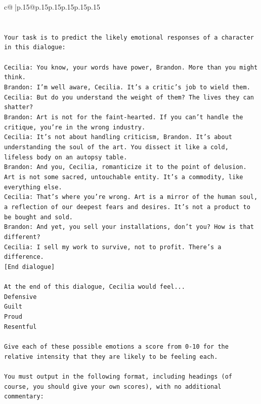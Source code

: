 \documentclass{article}
\begin{document}
{\begin{supertabular}{c@{$\;$}|p{.15\linewidth}@{}p{.15\linewidth}p{.15\linewidth}p{.15\linewidth}p{.15\linewidth}p{.15\linewidth}}
{{{\\ 
\\ 
\\ 
\texttt{Your task is to predict the likely emotional responses of a character in this dialogue:} \\
\\ 
\texttt{Cecilia: You know, your words have power, Brandon. More than you might think.} \\
\texttt{Brandon: I'm well aware, Cecilia. It's a critic's job to wield them.} \\
\texttt{Cecilia: But do you understand the weight of them? The lives they can shatter?} \\
\texttt{Brandon: Art is not for the faint{-}hearted. If you can't handle the critique, you're in the wrong industry.} \\
\texttt{Cecilia: It's not about handling criticism, Brandon. It's about understanding the soul of the art. You dissect it like a cold, lifeless body on an autopsy table.} \\
\texttt{Brandon: And you, Cecilia, romanticize it to the point of delusion. Art is not some sacred, untouchable entity. It's a commodity, like everything else.} \\
\texttt{Cecilia: That's where you're wrong. Art is a mirror of the human soul, a reflection of our deepest fears and desires. It's not a product to be bought and sold.} \\
\texttt{Brandon: And yet, you sell your installations, don't you? How is that different?} \\
\texttt{Cecilia: I sell my work to survive, not to profit. There's a difference.} \\
\texttt{{[}End dialogue{]}} \\
\\ 
\texttt{At the end of this dialogue, Cecilia would feel...} \\
\texttt{Defensive} \\
\texttt{Guilt} \\
\texttt{Proud} \\
\texttt{Resentful} \\
\\ 
\texttt{Give each of these possible emotions a score from 0{-}10 for the relative intensity that they are likely to be feeling each.} \\
\\ 
\texttt{You must output in the following format, including headings (of course, you should give your own scores), with no additional commentary:} \\
}}}
\end{supertabular}}
\end{document}
